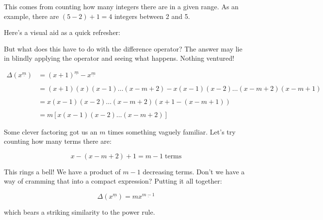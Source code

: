 \documentclass{standalone}
\begin{document}
This comes from counting how many integers there are in a given range. As an
example, there are $(5 - 2) + 1 = 4$ integers between 2 and 5.

Here's a visual aid as a quick refresher:


But what does this have to do with the difference operator? The answer may lie
in blindly applying the operator and seeing what happens. Nothing ventured!

\begin{align*}
  \Delta(x^{\underline{m}})
  &= (x + 1)^{\underline{m}} - x^{\underline{m}} \\ \\
  &= (x+1)(x)(x-1)\dots(x-m+2) - x(x-1)(x-2)\dots(x-m+2)(x-m+1) \\ \\
  &= x(x-1)(x-2)\dots(x-m+2)(x + 1 - (x - m + 1)) \\ \\
  &= m[x(x-1)(x-2)\dots(x-m+2)]
\end{align*}

Some clever factoring got us an $m$ times something vaguely familiar. Let's try
counting how many terms there are:

\[
  x - (x - m + 2) + 1 = m - 1 \; \text{terms}
\]

This rings a bell! We have a product of $m - 1$ decreasing terms. Don't we have
a way of cramming that into a compact expression? Putting it all together:

\[
  \Delta(x^{\underline{m}}) = mx^{\underline{m-1}}
\]

which bears a striking similarity to the power rule.
\end{document}
